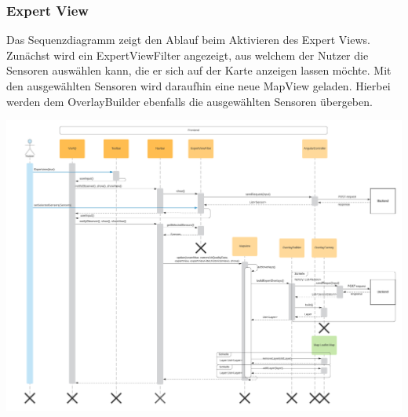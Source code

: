 \subsubsection{Expert View}
\label{Screenshots}
Das Sequenzdiagramm zeigt den Ablauf beim Aktivieren des Expert Views. Zunächst wird ein ExpertViewFilter angezeigt, aus welchem der Nutzer die Sensoren auswählen kann, die er sich auf der Karte anzeigen lassen möchte. Mit den ausgewählten Sensoren wird daraufhin eine neue MapView geladen. Hierbei werden dem OverlayBuilder ebenfalls die ausgewählten Sensoren übergeben.
\begin{center}
	\includegraphics[width=1\textwidth]{media/frontend/sequence-diagram/sequenceExpertViewFilter.png} 
\end{center}


